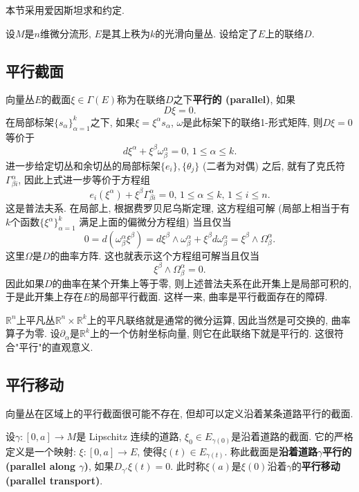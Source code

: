 
本节采用爱因斯坦求和约定.

设$M$是$n$维微分流形, $E$是其上秩为$k$的光滑向量丛. 设给定了$E$上的联络$D$.

\subsection{平行截面}

向量丛$E$的截面$\xi\in\Gamma(E)$称为在联络$D$之下\textbf{平行的 (parallel)}, 如果
$$D\xi=0.$$
在局部标架$\{s_\alpha\}_{\alpha=1}^k$之下, 如果$\xi=\xi^\alpha s_\alpha$, $\omega$是此标架下的联络1-形式矩阵, 则$D\xi=0$等价于
$$
d\xi^\alpha+\xi^\beta\omega^\alpha_\beta=0,\,1\leq \alpha\leq k.
$$
进一步给定切丛和余切丛的局部标架$\{e_i\},\{\theta_j\}$ (二者为对偶) 之后, 就有了克氏符$\Gamma_{\beta i}^\alpha$, 因此上式进一步等价于方程组
$$
e_i(\xi^\alpha)+\xi^\beta\Gamma^\alpha_{\beta i}=0,\,1\leq \alpha\leq k,\,1\leq i\leq n.
$$
这是普法夫系. 在局部上, 根据费罗贝尼乌斯定理, 这方程组可解 (局部上相当于有$k$个函数$\{\xi^\alpha\}_{\alpha=1}^k$ 满足上面的偏微分方程组) 当且仅当
$$
0=d(\omega^\alpha_\beta\xi^\beta)=d\xi^\beta\wedge\omega^\alpha_\beta+\xi^\beta d\omega^\alpha_\beta=\xi^\beta\wedge\Omega_\beta^\alpha.
$$
这里$\Omega$是$D$的曲率方阵. 这也就表示这个方程组可解当且仅当
$$
\xi^\beta\wedge\Omega_\beta^\alpha=0.
$$
因此如果$D$的曲率在某个开集上等于零, 则上述普法夫系在此开集上是局部可积的, 于是此开集上存在$E$的局部平行截面. 这样一来, 曲率是平行截面存在的障碍.

$\mathbb{R}^n$上平凡丛$\mathbb{R}^n\times\mathbb{R}^k$上的平凡联络就是通常的微分运算, 因此当然是可交换的, 曲率算子为零. 设$\partial_\alpha$是$\mathbb{R}^k$上的一个仿射坐标向量, 则它在此联络下就是平行的. 这很符合"平行"的直观意义. 

\subsection{平行移动}
向量丛在区域上的平行截面很可能不存在, 但却可以定义沿着某条道路平行的截面. 

设$\gamma:[0,a]\to M$是 Lipschitz 连续的道路, $\xi_0\in E_{\gamma(0)}$是沿着道路的截面. 它的严格定义是一个映射: $\xi:[0,a]\to E$, 使得$\xi(t)\in E_{\gamma(t)}$. 称此截面是\textbf{沿着道路$\gamma$平行的 (parallel along $\gamma$)}, 如果$D_{\gamma'}\xi(t)=0$. 此时称$\xi(a)$是$\xi(0)$沿着$\gamma$的\textbf{平行移动 (parallel transport)}. 

